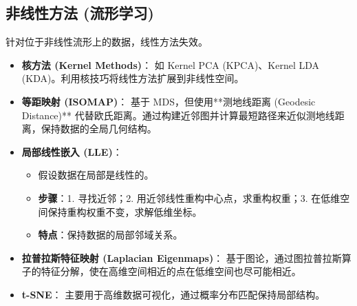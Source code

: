\documentclass[a4paper, 11pt]{ctexart}
\begin{document}
\subsection{非线性方法 (流形学习)}
针对位于非线性流形上的数据，线性方法失效。
\begin{itemize}
    \item \textbf{核方法 (Kernel Methods)}：
    如 Kernel PCA (KPCA)、Kernel LDA (KDA)。利用核技巧将线性方法扩展到非线性空间。
    \item \textbf{等距映射 (ISOMAP)}：
    基于 MDS，但使用**测地线距离 (Geodesic Distance)** 代替欧氏距离。通过构建近邻图并计算最短路径来近似测地线距离，保持数据的全局几何结构。
    \item \textbf{局部线性嵌入 (LLE)}：
    \begin{itemize}
        \item 假设数据在局部是线性的。
        \item \textbf{步骤}：1. 寻找近邻；2. 用近邻线性重构中心点，求重构权重；3. 在低维空间保持重构权重不变，求解低维坐标。
        \item \textbf{特点}：保持数据的局部邻域关系。
    \end{itemize}
    \item \textbf{拉普拉斯特征映射 (Laplacian Eigenmaps)}：
    基于图论，通过图拉普拉斯算子的特征分解，使在高维空间相近的点在低维空间也尽可能相近。
    \item \textbf{t-SNE}：
    主要用于高维数据可视化，通过概率分布匹配保持局部结构。
\end{itemize}
\end{document}
